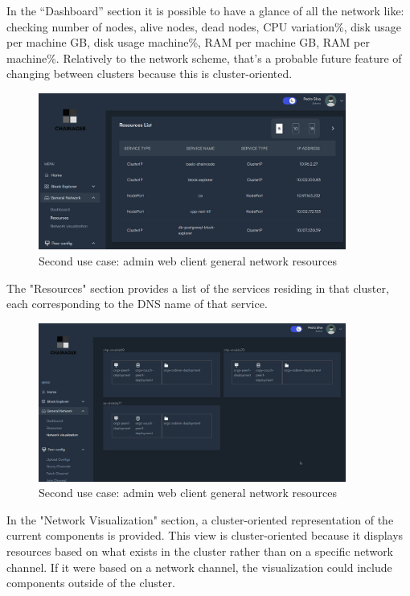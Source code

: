 In the “Dashboard” section it is possible to have a glance of all the network like: checking number of nodes, alive nodes, dead nodes, CPU variation\%, disk usage per machine GB, disk usage machine\%, RAM per machine GB, RAM per machine\%. Relatively to the network scheme, that's a probable future feature of changing between clusters because this is cluster-oriented.

\begin{figure}[H]
    \centering
    \includegraphics[width=0.9\textwidth]{assets/use-case-2/general-network-resources.png} %
    \caption{Second use case: admin web client general network resources}
    \label{fig:sample-image} 
\end{figure}

The "Resources" section provides a list of the services residing in that cluster, each corresponding to the DNS name of that service.

\begin{figure}[H]
    \centering
    \includegraphics[width=0.9\textwidth]{assets/use-case-2/network-visualization.png} %
    \caption{Second use case: admin web client general network resources}
    \label{fig:sample-image} 
\end{figure}

In the "Network Visualization" section, a cluster-oriented representation of the current components is provided. This view is cluster-oriented because it displays resources based on what exists in the cluster rather than on a specific network channel. If it were based on a network channel, the visualization could include components outside of the cluster.

